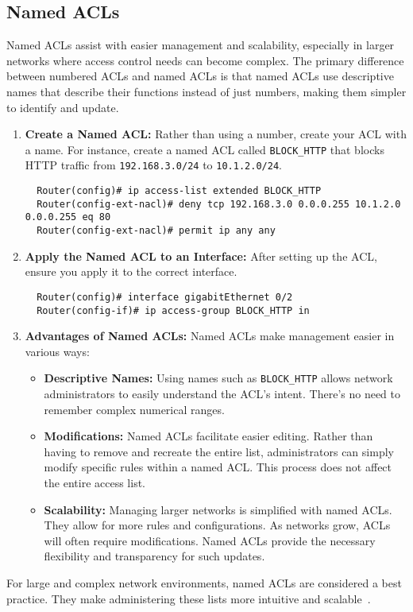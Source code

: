 \documentclass[11pt,a4paper]{article}
\begin{document}
    \subsection*{Named ACLs}
    Named ACLs assist with easier management and scalability, especially in larger networks where access control needs can become complex. The primary difference between numbered ACLs and named ACLs is that named ACLs use descriptive names that describe their functions instead of just numbers, making them simpler to identify and update.
        \begin{enumerate}
            \item \textbf{Create a Named ACL:} Rather than using a number, create your ACL with a name. For instance, create a named ACL called \lstinline{BLOCK_HTTP} that blocks HTTP traffic from \lstinline{192.168.3.0/24} to \lstinline{10.1.2.0/24}.
\begin{lstlisting}
  Router(config)# ip access-list extended BLOCK_HTTP
  Router(config-ext-nacl)# deny tcp 192.168.3.0 0.0.0.255 10.1.2.0 0.0.0.255 eq 80
  Router(config-ext-nacl)# permit ip any any
\end{lstlisting}
            \item \textbf{Apply the Named ACL to an Interface:} After setting up the ACL, ensure you apply it to the correct interface.
\begin{lstlisting}
  Router(config)# interface gigabitEthernet 0/2
  Router(config-if)# ip access-group BLOCK_HTTP in                
\end{lstlisting}
            
            \item \textbf{Advantages of Named ACLs:} Named ACLs make management easier in various ways:
                \begin{itemize}
                    \item \textbf{Descriptive Names:} Using names such as \lstinline{BLOCK_HTTP}  allows network administrators to easily understand the ACL's intent. There’s no need to remember complex numerical ranges.

                    \item \textbf{Modifications:} Named ACLs facilitate easier editing. Rather than having to remove and recreate the entire list, administrators can simply modify specific rules within a named ACL. This process does not affect the entire access list.

                    \item \textbf{Scalability:} Managing larger networks is simplified with named ACLs. They allow for more rules and configurations. As networks grow, ACLs will often require modifications. Named ACLs provide the necessary flexibility and transparency for such updates.
                \end{itemize}

        \end{enumerate}
        For large and complex network environments, named ACLs are considered a best practice. They make administering these lists more intuitive and scalable~\cite{Configuring-Named-ACLs}.
\end{document}
